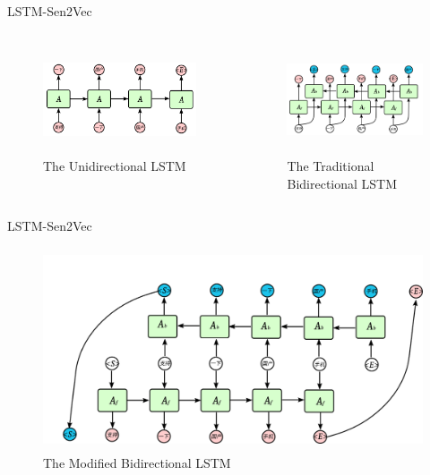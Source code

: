 \documentclass[aspectratio=169]{beamer} %
\begin{document}
    \begin{frame}{LSTM-Sen2Vec}
      \begin{columns}
      \begin{column}[t]{0.5\textwidth}
        \begin{figure}
        \includegraphics[width=6.7cm,height=3.2cm]{unilstm.png}
        \caption{The Unidirectional LSTM}
        \end{figure}
      \end{column}

      \begin{column}[t]{0.5\textwidth}
        \begin{figure}
        \includegraphics[width=6cm,height=3.2cm]{bilstm1.png}
        \caption{The Traditional Bidirectional LSTM}
        \end{figure}
      \end{column}

      \end{columns}
    \end{frame}

    \begin{frame}{LSTM-Sen2Vec}
      \begin{figure}
        \includegraphics[width=12cm,height=6cm]{bilstm2.png}
        \caption{The Modified Bidirectional LSTM}
        \end{figure}
    \end{frame}
\end{document}
